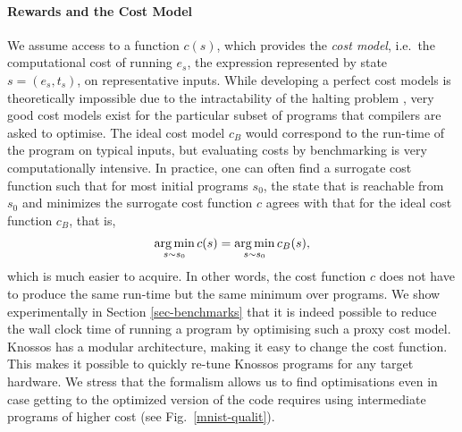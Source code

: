 \documentclass[fullpage,twocolumn]{article} %
\begin{document}
\paragraph{Rewards and the Cost Model} 
We assume access to a function $c(s)$, which provides the \emph{cost model}, i.e.\ the computational cost of running  $e_s$, the expression represented by state $s = (e_s,t_s)$, on representative inputs. While developing a perfect cost models is theoretically impossible due to the intractability of the halting problem \citep{turing1937computable}, very good cost models exist for the particular subset of programs that compilers are asked to optimise. The ideal cost model $c_B$ would correspond to the run-time of the program on typical inputs, but evaluating costs by benchmarking is very computationally intensive. In practice, one can often find a surrogate cost function such that for most initial programs $s_0$, the state that is reachable from $s_0$ and minimizes the surrogate cost function $c$ agrees with that for the ideal cost function $c_B$, that is,
\begin{gather}
\operatorname*{arg\,min}_{s\sim s_0}  c(s) = \operatorname*{arg\,min}_{s\sim s_0} c_B(s),
\end{gather}
which is much easier to acquire. In other words, the cost function $c$ does not have to produce the same run-time but the same minimum over programs. We show experimentally in Section \ref{sec-benchmarks} that it is indeed possible to reduce the wall clock time of running a program by optimising such a proxy cost model. Knossos has a modular architecture, making it easy to change the cost function. This makes it possible to quickly re-tune Knossos programs for any target hardware. We stress that the formalism allows us to find optimisations even in case getting to the optimized version of the code requires using intermediate programs of higher cost (see Fig.~\ref{mnist-qualit}).
\end{document}
